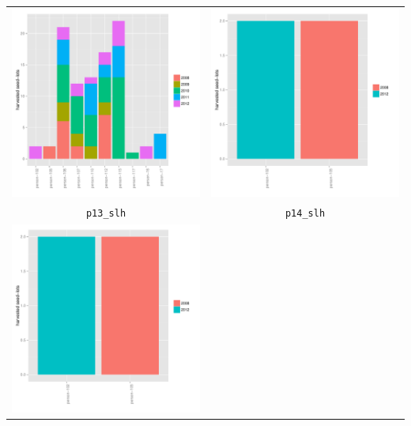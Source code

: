 \documentclass{article}\usepackage[]{graphicx}\usepackage[]{color}
\newenvironment{knitrout}{}{} %
\begin{document}
\begin{itemize}
\begin{center}
\begin{tabular}{cc}
\begin{knitrout}
{\centering \includegraphics[width=.4\textwidth]{figures/shinemas2R_unnamed-chunk-38-1} 

}



\end{knitrout}
&
\begin{knitrout}
\definecolor{shadecolor}{rgb}{0.969, 0.969, 0.969}\color{fgcolor}

{\centering \includegraphics[width=.4\textwidth]{figures/shinemas2R_unnamed-chunk-39-1} 

}



\end{knitrout}
\\
\texttt{p13\_slh} & \texttt{p14\_slh} \\
\begin{knitrout}
\definecolor{shadecolor}{rgb}{0.969, 0.969, 0.969}\color{fgcolor}

{\centering \includegraphics[width=.4\textwidth]{figures/shinemas2R_unnamed-chunk-40-1} 

}
\end{knitrout}
\end{tabular}
\end{center}
\end{itemize}
\end{document}
